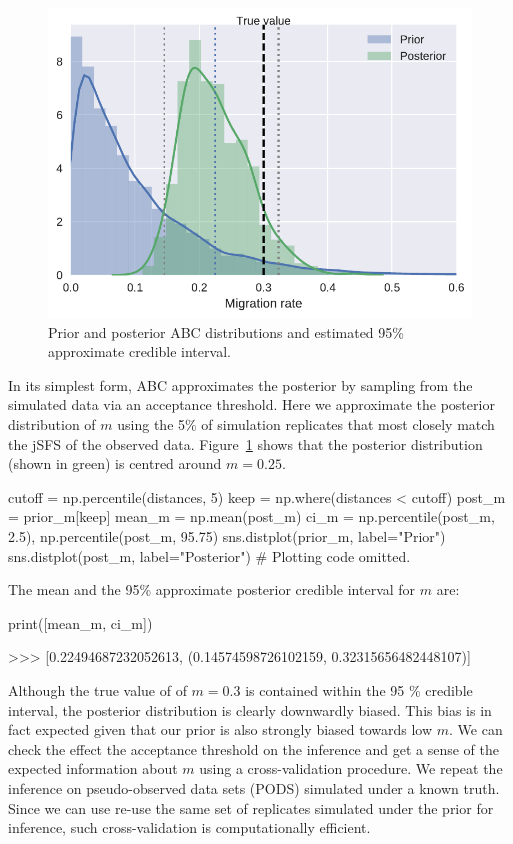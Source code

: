 \documentclass[graybox]{svmult}
\begin{document}
\begin{figure}
    \begin{center}
    \includegraphics[width=\textwidth]{images/inference-example_13_0.pdf}
    \end{center}
    \caption{\label{fig:abc-posterior}Prior and posterior ABC distributions
    and estimated 95\% approximate credible interval.}
\end{figure}

    In its simplest form, ABC approximates the posterior by sampling from
the simulated data via an acceptance threshold. Here we approximate the
posterior distribution of \(m\) using the 5\% of simulation replicates
that most closely match the jSFS of the observed data.
Figure~\ref{fig:abc-posterior} shows that the posterior
distribution (shown in green) is centred around \(m=0.25\).
\begin{pythoncode}
cutoff = np.percentile(distances, 5)
keep = np.where(distances < cutoff)
post_m = prior_m[keep]
mean_m = np.mean(post_m)
ci_m = np.percentile(post_m, 2.5), np.percentile(post_m, 95.75)
sns.distplot(prior_m, label="Prior")
sns.distplot(post_m, label="Posterior")
# Plotting code omitted.
\end{pythoncode}

The mean and the 95\% approximate posterior credible interval for \(m\)
are:
\begin{pythoncode}
print([mean_m, ci_m])

>>> [0.22494687232052613, (0.14574598726102159, 0.32315656482448107)]
\end{pythoncode}


Although the true value of of \(m=0.3\) is contained within the 95 \% credible interval, the posterior distribution is clearly downwardly biased. This bias is in fact expected given that our prior is also strongly biased towards low \(m\). We can check the effect the acceptance threshold on the inference and get a sense of the expected information about \(m\) using a cross-validation procedure. We repeat the inference on pseudo-observed data sets (PODS) simulated under a known truth. Since we can use re-use the same set of replicates simulated under the prior for inference, such cross-validation is computationally efficient.
\end{document}
